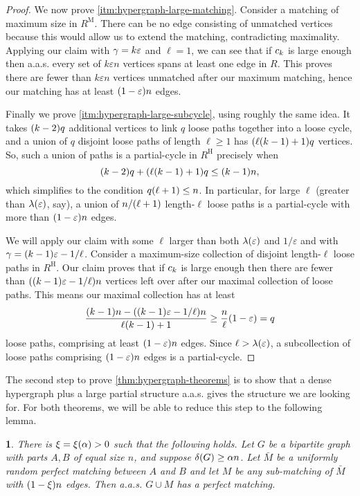 \documentclass[11pt,english]{article}
\theoremstyle{plain}
\theoremstyle{definition}
\theoremstyle{definition}
\theoremstyle{plain}
\theoremstyle{plain}
\theoremstyle{plain}
\newtheorem{lem}[thm]{\protect\lemmaname}
\theoremstyle{plain}
\theoremstyle{remark}
\theoremstyle{remark}
\let\originalleft\left
\let\originalright\right
\renewcommand{\left}{\mathopen{}\mathclose\bgroup\originalleft}
\renewcommand{\right}{\aftergroup\egroup\originalright}
\providecommand{\lemmaname}{Lemma}
\begin{document}
\begin{proof}
We now prove \ref{itm:hypergraph-large-matching}. Consider a matching of maximum size in $R^{\mathrm{M}}$.
There can be no edge consisting of unmatched vertices because this would
allow us to extend the matching, contradicting maximality. Applying
our claim with $\gamma=k\varepsilon$ and $\ell=1$, we can see that
if $c_{k}$ is large enough then
a.a.s. every set of $k\varepsilon n$ vertices spans at least one
edge in $R$. This proves there are fewer than $k\varepsilon n$
vertices unmatched after our maximum matching, hence our matching
has at least $\left(1-\varepsilon\right)n$ edges.

Finally we prove \ref{itm:hypergraph-large-subcycle}, using roughly the same idea. It takes $\left(k-2\right)q$ additional
vertices to link $q$ loose paths together into a loose cycle, and
a union of $q$ disjoint loose paths of length $\ell\ge1$ has $\left(\ell\left(k-1\right)+1\right)q$
vertices. So, such a union of paths is a partial-cycle in $R^{\mathrm{H}}$
precisely when 
\[
\left(k-2\right)q+\left(\ell\left(k-1\right)+1\right)q\le\left(k-1\right)n,
\]
which simplifies to the condition $q\left(\ell+1\right) \leq n$. In particular,
for large $\ell$ (greater than $\lambda\left(\varepsilon\right)$, say), a union of $n/\left(\ell+1\right)$
length-$\ell$ loose paths is a partial-cycle
with more than $\left(1-\varepsilon\right)n$ edges.

We will apply our claim with some $\ell$ larger than both $\lambda\left(\varepsilon\right)$ and $1/\varepsilon$ and with $\patheps=\left(k-1\right)\varepsilon-1/\ell$. Consider a maximum-size collection of disjoint length-$\ell$ loose paths in $R^{\mathrm{H}}$. Our claim proves that if $c_{k}$ is large enough then there are fewer than $\left(\left(k-1\right)\varepsilon-1/\ell\right)n$ vertices left over after our maximal collection of loose paths. This means our maximal collection has at least
\[
\frac{\left(k-1\right)n-\left(\left(k-1\right)\varepsilon-1/\ell\right)n}{\ell\left(k-1\right)+1}\ge\frac{n}{\ell}\left(1-\varepsilon\right)=q
\]
loose paths, comprising at least $\left(1-\varepsilon\right)n$
edges. Since $\ell> \lambda\left(\varepsilon\right)$, a subcollection of loose paths comprising $\left(1-\varepsilon\right)n$ edges is a partial-cycle.
\end{proof}
The second step to prove \ref{thm:hypergraph-theorems} is to show that a dense
hypergraph plus a large partial structure a.a.s. gives the structure
we are looking for. For both theorems, we will be able to reduce this
step to the following lemma.
\begin{lem}
\label{lem:bipartite-plus-big-matching-perfect}There is $\xi=\xi\left(\alpha\right)>0$ 
such that the following holds. Let $G$ be a bipartite graph with
parts $A,B$ of equal size $n$, and suppose $\delta\left(G\right)\ge\alpha n$.
Let $\bar{M}$ be a uniformly random perfect matching between $A$
and $B$ and let $M$ be any sub-matching of $\bar{M}$ with $\left(1-\xi\right) n$
edges. Then a.a.s. $G\cup M$ has a perfect matching. 
\end{lem}
\end{document}
